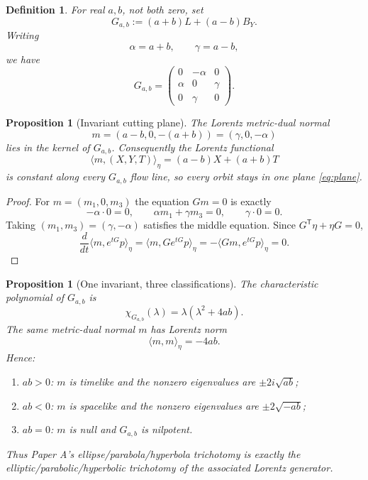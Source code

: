 \documentclass[11pt]{amsart}
\newtheorem{proposition}[theorem]{Proposition}
\newtheorem{definition}[theorem]{Definition}
\theoremstyle{remark}
\begin{document}
\begin{definition}
For real $a,b$, not both zero, set
\begin{equation}\label{eq:G}
G_{a,b}:=(a+b)L+(a-b)B_Y.
\end{equation}
Writing
\[
\alpha=a+b,
\qquad
\gamma=a-b,
\]
we have
\[
G_{a,b}
=\begin{pmatrix}
0&-\alpha&0\\
\alpha&0&\gamma\\
0&\gamma&0
\end{pmatrix}.
\]
\end{definition}

\begin{proposition}[Invariant cutting plane]\label{prop:invariant}
The Lorentz metric-dual normal
\[
m=(a-b,0,-(a+b))=(\gamma,0,-\alpha)
\]
lies in the kernel of $G_{a,b}$.  Consequently the Lorentz functional
\[
\langle m,(X,Y,T)\rangle_\eta
=(a-b)X+(a+b)T
\]
is constant along every $G_{a,b}$ flow line, so every orbit stays in one plane \eqref{eq:plane}.
\end{proposition}

\begin{proof}
For $m=(m_1,0,m_3)$ the equation $Gm=0$ is exactly
\[
-\alpha\cdot0=0,
\qquad
\alpha m_1+\gamma m_3=0,
\qquad
\gamma\cdot0=0.
\]
Taking $(m_1,m_3)=(\gamma,-\alpha)$ satisfies the middle equation.  Since $G^{\mathsf T}\eta+\eta G=0$,
\[
\frac{d}{dt}\langle m,e^{tG}p\rangle_\eta
=\langle m,Ge^{tG}p\rangle_\eta
=-\langle Gm,e^{tG}p\rangle_\eta=0.
\]
\end{proof}

\begin{proposition}[One invariant, three classifications]\label{prop:classification}
The characteristic polynomial of $G_{a,b}$ is
\begin{equation}\label{eq:charpoly}
\boxed{\chi_{G_{a,b}}(\lambda)=\lambda(\lambda^2+4ab).}
\end{equation}
The same metric-dual normal $m$ has Lorentz norm
\begin{equation}\label{eq:normalnorm}
\boxed{\langle m,m\rangle_\eta=-4ab.}
\end{equation}
Hence:
\begin{enumerate}[label=(\roman*)]
\item $ab>0$: $m$ is timelike and the nonzero eigenvalues are $\pm2i\sqrt{ab}$;
\item $ab<0$: $m$ is spacelike and the nonzero eigenvalues are $\pm2\sqrt{-ab}$;
\item $ab=0$: $m$ is null and $G_{a,b}$ is nilpotent.
\end{enumerate}
Thus Paper A's ellipse/parabola/hyperbola trichotomy is exactly the elliptic/parabolic/hyperbolic trichotomy of the associated Lorentz generator.
\end{proposition}
\end{document}

